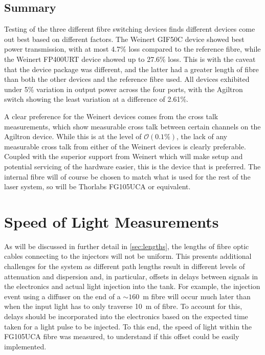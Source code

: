 \documentclass[a4paper,11pt]{article}
\let\oldsim\sim
\renewcommand{\sim}{{\oldsim}}
\begin{document}
\subsection{Summary}
Testing of the three different fibre switching devices finds different devices come out best based on different factors. The Weinert GIF50C device showed best power transmission, with at most 4.7\% loss compared to the reference fibre, while the Weinert FP400URT device showed up to 27.6\% loss. This is with the caveat that the device package was different, and the latter had a greater length of fibre than both the other devices and the reference fibre used. All devices exhibited under 5\% variation in output power across the four ports, with the Agiltron switch showing the least variation at a difference of 2.61\%.

A clear preference for the Weinert devices comes from the cross talk measurements, which show measurable cross talk between certain channels on the Agiltron device. While this is at the level of $\mathcal{O}(0.1\%)$, the lack of any measurable cross talk from either of the Weinert devices is clearly preferable. Coupled with the superior support from Weinert which will make setup and potential servicing of the hardware easier, this is the device that is preferred. The internal fibre will of course be chosen to match what is used for the rest of the laser system, so will be Thorlabs FG105UCA or equivalent.


\section{Speed of Light Measurements}\label{sec:c}

As will be discussed in further detail in \cref{sec:lengths}, the lengths of fibre optic cables connecting to the injectors will not be uniform. This presents additional challenges for the system as different path lengths result in different levels of attenuation and dispersion and, in particular, offsets in delays between signals in the electronics and actual light injection into the tank. For example, the injection event using a diffuser on the end of a $\sim160$~m fibre will occur much later than when the input light has to only traverse 10~m of fibre. To account for this, delays should be incorporated into the electronics based on the expected time taken for a light pulse to be injected. To this end, the speed of light within the FG105UCA fibre was measured, to understand if this offset could be easily implemented.
\end{document}
